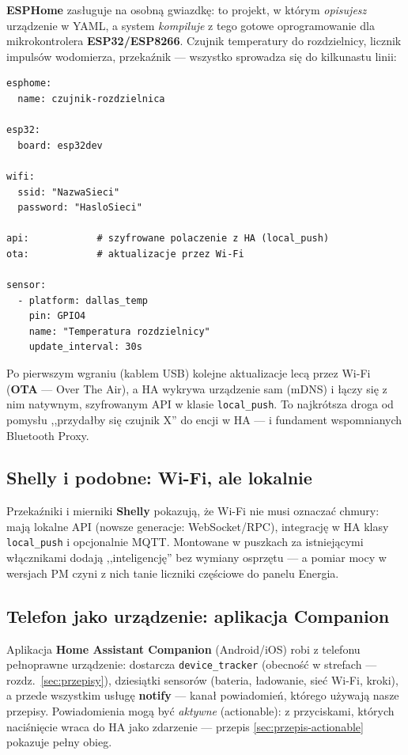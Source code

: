 \documentclass[11pt,a4paper]{article}
\begin{document}
\textbf{ESPHome} zasługuje na osobną gwiazdkę: to projekt, w którym \emph{opisujesz} urządzenie w YAML, a system \emph{kompiluje} z tego gotowe oprogramowanie dla mikrokontrolera \textbf{ESP32/ESP8266}. Czujnik temperatury do rozdzielnicy, licznik impulsów wodomierza, przekaźnik --- wszystko sprowadza się do kilkunastu linii:

\begin{lstlisting}
esphome:
  name: czujnik-rozdzielnica

esp32:
  board: esp32dev

wifi:
  ssid: "NazwaSieci"
  password: "HasloSieci"

api:            # szyfrowane polaczenie z HA (local_push)
ota:            # aktualizacje przez Wi-Fi

sensor:
  - platform: dallas_temp
    pin: GPIO4
    name: "Temperatura rozdzielnicy"
    update_interval: 30s
\end{lstlisting}

Po pierwszym wgraniu (kablem USB) kolejne aktualizacje lecą przez Wi-Fi (\textbf{OTA} --- Over The Air), a HA wykrywa urządzenie sam (mDNS) i łączy się z nim natywnym, szyfrowanym API w klasie \texttt{local\_push}. To najkrótsza droga od pomysłu ,,przydałby się czujnik X'' do encji w HA --- i fundament wspomnianych Bluetooth Proxy.

\subsection{Shelly i podobne: Wi-Fi, ale lokalnie}

Przekaźniki i mierniki \textbf{Shelly} pokazują, że Wi-Fi nie musi oznaczać chmury: mają lokalne API (nowsze generacje: WebSocket/RPC), integrację w HA klasy \texttt{local\_push} i opcjonalnie MQTT. Montowane w puszkach za istniejącymi włącznikami dodają ,,inteligencję'' bez wymiany osprzętu --- a pomiar mocy w wersjach PM czyni z nich tanie liczniki częściowe do panelu Energia.

\subsection{Telefon jako urządzenie: aplikacja Companion}
\label{sec:companion}

Aplikacja \textbf{Home Assistant Companion} (Android/iOS) robi z telefonu pełnoprawne urządzenie: dostarcza \texttt{device\_tracker} (obecność w strefach --- rozdz.~\ref{sec:przepisy}), dziesiątki sensorów (bateria, ładowanie, sieć Wi-Fi, kroki), a przede wszystkim usługę \textbf{notify} --- kanał powiadomień, którego używają nasze przepisy. Powiadomienia mogą być \emph{aktywne} (actionable): z przyciskami, których naciśnięcie wraca do HA jako zdarzenie --- przepis \ref{sec:przepis-actionable} pokazuje pełny obieg.
\end{document}

